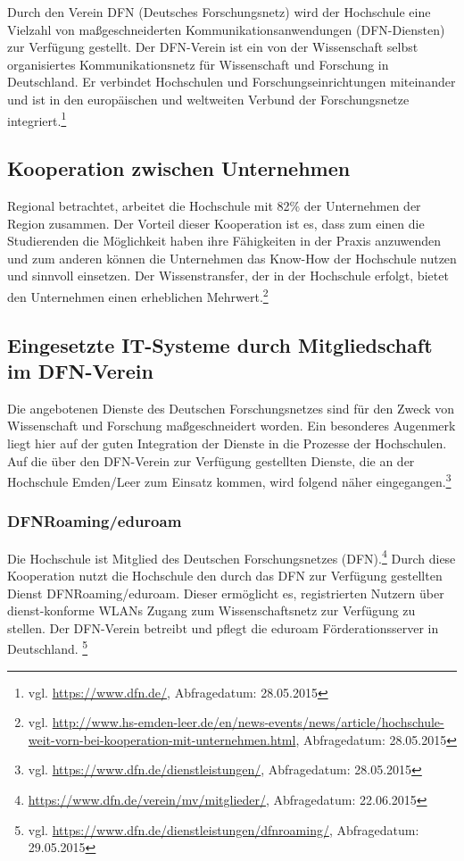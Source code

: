 Durch den Verein DFN (Deutsches Forschungsnetz) wird der Hochschule eine Vielzahl von maßgeschneiderten Kommunikationsanwendungen (DFN-Diensten) zur Verfügung gestellt. Der DFN-Verein ist ein von der Wissenschaft selbst organisiertes Kommunikationsnetz für Wissenschaft und Forschung in Deutschland. Er verbindet Hochschulen und Forschungseinrichtungen miteinander und ist in den europäischen und weltweiten  Verbund der Forschungsnetze integriert.\footnote{vgl. \url{https://www.dfn.de/}, Abfragedatum: 28.05.2015}

\subsection{Kooperation zwischen Unternehmen}
Regional betrachtet, arbeitet die Hochschule mit 82\% der Unternehmen der Region zusammen. Der Vorteil dieser Kooperation ist es, dass zum einen die Studierenden die Möglichkeit haben ihre Fähigkeiten in der Praxis anzuwenden und zum anderen können die Unternehmen das Know-How  der Hochschule nutzen und sinnvoll einsetzen. Der Wissenstransfer, der in der Hochschule erfolgt, bietet den Unternehmen einen erheblichen Mehrwert.\footnote{vgl. \url{http://www.hs-emden-leer.de/en/news-events/news/article/hochschule-weit-vorn-bei-kooperation-mit-unternehmen.html}, Abfragedatum: 28.05.2015}

\subsection{Eingesetzte IT-Systeme durch Mitgliedschaft im DFN-Verein}
Die angebotenen Dienste des Deutschen Forschungsnetzes sind für den Zweck von Wissenschaft und Forschung maßgeschneidert worden. Ein besonderes Augenmerk liegt hier auf der guten Integration der Dienste in die Prozesse der Hochschulen.  Auf die über den DFN-Verein zur Verfügung gestellten Dienste, die an der Hochschule Emden/Leer zum Einsatz kommen, wird folgend näher eingegangen.\footnote{vgl. \url{https://www.dfn.de/dienstleistungen/}, Abfragedatum: 28.05.2015}

\subsubsection{DFNRoaming/eduroam}
Die Hochschule ist Mitglied des Deutschen Forschungsnetzes (DFN).\footnote{\url{https://www.dfn.de/verein/mv/mitglieder/}, Abfragedatum: 22.06.2015} Durch diese Kooperation nutzt die Hochschule den durch das DFN zur Verfügung gestellten Dienst DFNRoaming/eduroam. Dieser ermöglicht es, registrierten Nutzern über dienst-konforme WLANs Zugang zum Wissenschaftsnetz zur Verfügung zu stellen. Der DFN-Verein betreibt und pflegt die eduroam Förderationsserver in Deutschland. \footnote{vgl. \url{https://www.dfn.de/dienstleistungen/dfnroaming/}, Abfragedatum: 29.05.2015} 


